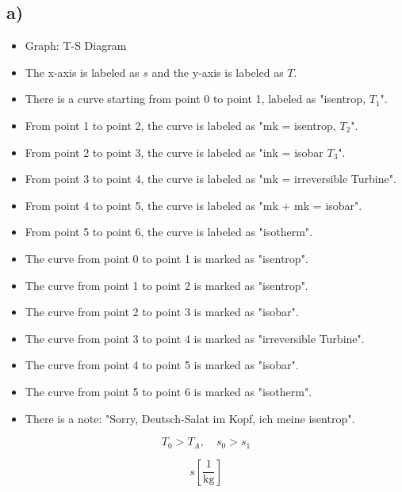 

\subsection*{a)}

\begin{itemize}
    \item Graph: T-S Diagram
    \item The x-axis is labeled as $s$ and the y-axis is labeled as $T$.
    \item There is a curve starting from point 0 to point 1, labeled as "isentrop, $T_1$".
    \item From point 1 to point 2, the curve is labeled as "mk = isentrop, $T_2$".
    \item From point 2 to point 3, the curve is labeled as "ink = isobar $T_3$".
    \item From point 3 to point 4, the curve is labeled as "mk = irreversible Turbine".
    \item From point 4 to point 5, the curve is labeled as "mk + mk = isobar".
    \item From point 5 to point 6, the curve is labeled as "isotherm".
    \item The curve from point 0 to point 1 is marked as "isentrop".
    \item The curve from point 1 to point 2 is marked as "isentrop".
    \item The curve from point 2 to point 3 is marked as "isobar".
    \item The curve from point 3 to point 4 is marked as "irreversible Turbine".
    \item The curve from point 4 to point 5 is marked as "isobar".
    \item The curve from point 5 to point 6 is marked as "isotherm".
    \item There is a note: "Sorry, Deutsch-Salat im Kopf, ich meine isentrop".
\end{itemize}

\[
T_0 > T_A, \quad s_0 > s_1
\]

\[
s \left[ \frac{1}{\text{kg}} \right]
\]